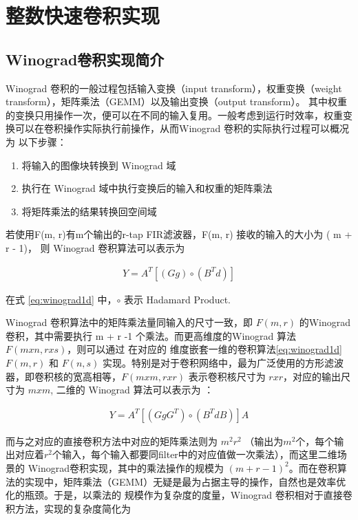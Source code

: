 
\chapter{整数快速卷积实现}
\label{cha:chapter03}

\section{Winograd卷积实现简介}

Winograd 卷积的一般过程包括输入变换（input transform），权重变换（weight transform），矩阵乘法（GEMM）以及输出变换（output transform）。
其中权重的变换只用操作一次，便可以在不同的输入复用。一般考虑到运行时效率，权重变换可以在卷积操作实际执行前操作，从而Winograd 卷积的实际执行过程可以概况为
以下步骤：
\begin{enumerate}
  \item 将输入的图像块转换到 Winograd 域
  \item 执行在 Winograd 域中执行变换后的输入和权重的矩阵乘法
  \item 将矩阵乘法的结果转换回空间域
\end{enumerate}

若使用F(m, r)有m个输出的r-tap FIR滤波器，F(m, r) 接收的输入的大小为 ( m + r - 1)， 则 Winograd 卷积算法可以表示为

\begin{align}
\label{eq:winograd1d}
  Y = A^T [(Gg) \circ (B^Td)]
\end{align}

在式 \ref{eq:winograd1d} 中，$\circ$ 表示 Hadamard Product.

Winograd 卷积算法中的矩阵乘法量同输入的尺寸一致，即 $F(m, r)$ 的Winograd 卷积，其中需要执行 m + r -1 个乘法。而更高维度的Winograd 算法 $F(mxn, rxs)$，则可以通过
在对应的 维度嵌套一维的卷积算法\ref{eq:winograd1d} $F(m, r)$ 和 $F(n, s)$ 实现。特别是对于卷积网络中，最为广泛使用的方形滤波器，即卷积核的宽高相等，$F(m x m, r x r)$
表示卷积核尺寸为 $r x r$，对应的输出尺寸为 $ m x m$, 二维的 Winograd 算法可以表示为 ：

\begin{align}
\label{eq:winograd2d}
  Y = A^T [(GgG^T) \circ (B^TdB)] A
\end{align}

而与之对应的直接卷积方法中对应的矩阵乘法则为 $m^2r^2$ （输出为$m^2$个，每个输出对应着$r^2$个输入，每个输入都要同filter中的对应值做一次乘法），而这里二维场景的
Winograd卷积实现，其中的乘法操作的规模为 $( m + r - 1)^2$。而在卷积算法的实现中，矩阵乘法（GEMM）无疑是最为占据主导的操作，自然也是效率优化的瓶颈。于是，以乘法的
规模作为复杂度的度量，Winograd 卷积相对于直接卷积方法，实现的复杂度简化为

